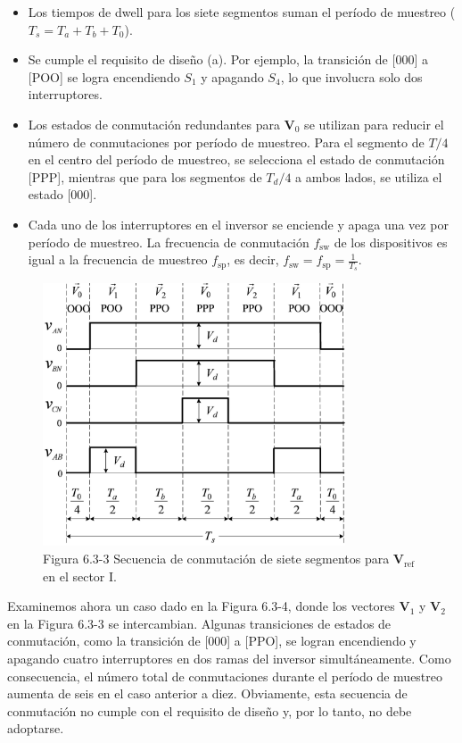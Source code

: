 \documentclass[letterpaper,12pt]{article}
\begin{document}
\begin{itemize}
    \item Los tiempos de dwell para los siete segmentos suman el período de muestreo (\( T_s = T_a + T_b + T_0 \)).
    \item Se cumple el requisito de diseño (a). Por ejemplo, la transición de [000] a [POO] se logra encendiendo \( S_1 \) y apagando \( S_4 \), lo que involucra solo dos interruptores.
    \item Los estados de conmutación redundantes para \( \mathbf{V}_0 \) se utilizan para reducir el número de conmutaciones por período de muestreo. Para el segmento de \( T/4 \) en el centro del período de muestreo, se selecciona el estado de conmutación [PPP], mientras que para los segmentos de \( T_d/4 \) a ambos lados, se utiliza el estado [000].
    \item Cada uno de los interruptores en el inversor se enciende y apaga una vez por período de muestreo. La frecuencia de conmutación \( f_{\text{sw}} \) de los dispositivos es igual a la frecuencia de muestreo \( f_{\text{sp}} \), es decir, \( f_{\text{sw}} = f_{\text{sp}} = \frac{1}{T_s} \).
\end{itemize}
    
\begin{figure}[h]
    \centering
    \includegraphics[width=0.8\textwidth]{graficos/img133.jpg}
    \caption{Figura 6.3-3 Secuencia de conmutación de siete segmentos para \( \mathbf{V}_{\text{ref}} \) en el sector I.}
    \label{fig:secuencia_conmutacion_7_segmentos}
\end{figure}
\FloatBarrier
    
Examinemos ahora un caso dado en la Figura 6.3-4, donde los vectores \( \mathbf{V}_1 \) y \( \mathbf{V}_2 \) en la Figura 6.3-3 se intercambian. Algunas transiciones de estados de conmutación, como la transición de [000] a [PPO], se logran encendiendo y apagando cuatro interruptores en dos ramas del inversor simultáneamente. Como consecuencia, el número total de conmutaciones durante el período de muestreo aumenta de seis en el caso anterior a diez. Obviamente, esta secuencia de conmutación no cumple con el requisito de diseño y, por lo tanto, no debe adoptarse.
    
\end{document}
